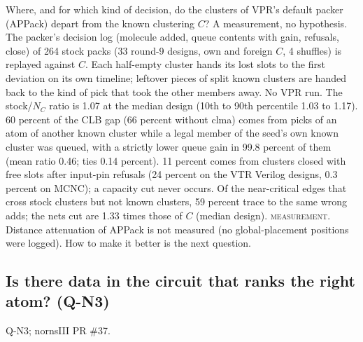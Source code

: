  Where, and for which kind of decision, do the clusters of VPR's default packer (APPack) depart from the known clustering $C$? A measurement, no hypothesis.
 The packer's decision log (molecule added, queue contents with gain, refusals, close) of 264 stock packs (33 round-9 designs, own and foreign $C$, 4 shuffles) is replayed against $C$. Each half-empty cluster hands its lost slots to the first deviation on its own timeline; leftover pieces of split known clusters are handed back to the kind of pick that took the other members away. No VPR run.
 The stock/$N_C$ ratio is 1.07 at the median design (10th to 90th percentile 1.03 to 1.17). 60 percent of the CLB gap (66 percent without clma) comes from picks of an atom of another known cluster while a legal member of the seed's own known cluster was queued, with a strictly lower queue gain in 99.8 percent of them (mean ratio 0.46; ties 0.14 percent). 11 percent comes from clusters closed with free slots after input-pin refusals (24 percent on the VTR Verilog designs, 0.3 percent on MCNC); a capacity cut never occurs. Of the near-critical edges that cross stock clusters but not known clusters, 59 percent trace to the same wrong adds; the nets cut are 1.33 times those of $C$ (median design).
 \textsc{measurement}. Distance attenuation of APPack is not measured (no global-placement positions were logged). How to make it better is the next question.

\subsection{Is there data in the circuit that ranks the right atom? (Q-N3)}
\label{sec:e-q3}

 Q-N3; nornsIII PR \#37.

